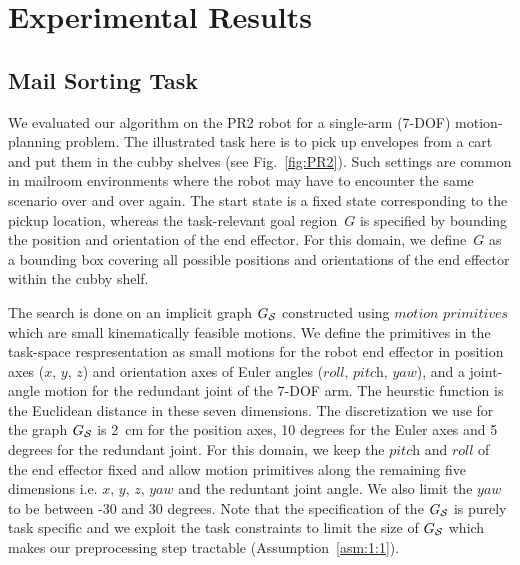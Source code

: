 \documentclass[a4paper]{report}
\begin{document}
\section{Experimental Results}
\label{sec:eval1}

\subsection{Mail Sorting Task}

We evaluated our algorithm on the PR2 robot for a single-arm (7-DOF) motion-planning problem. The illustrated task here is to pick up envelopes from a cart and put them in the cubby shelves (see Fig.~\ref{fig:PR2}). Such settings are common in mailroom environments where the robot may have to encounter the same scenario over and over again. The start state is a fixed state corresponding to the pickup location, whereas the task-relevant goal region~$G$ is specified by bounding the position and orientation of the end effector. For this domain, we define~$G$ as a bounding box covering all possible positions and orientations of the end effector within the cubby shelf.

The search is done on an implicit graph $G_\mathcal{S}$ constructed using $\textit{motion primitives}$ which are small kinematically feasible motions. We define the primitives in the task-space respresentation as small motions for the robot end effector in position axes ($\textit{x, y, z}$) and orientation axes of Euler angles ($\textit{roll, pitch, yaw}$), and a joint-angle motion for the redundant joint of the 7-DOF arm. 
The heurstic function is the Euclidean distance in these seven dimensions. The discretization we use for the graph $G_\mathcal{S}$ is 2~cm for the position axes, 10 degrees for the Euler axes and 5 degrees for the redundant joint. 
For this domain, we keep the $\textit{pitch}$ and $\textit{roll}$ of the end effector fixed and allow motion primitives along the remaining five dimensions i.e. $\textit{x, y, z, yaw}$ and the reduntant joint angle. We also limit the $\textit{yaw}$ to be between -30 and 30 degrees. Note that the specification of the $G_\mathcal{S}$ is purely task specific and we exploit the task constraints to limit the size of $G_\mathcal{S}$ which makes our preprocessing step tractable (Assumption~\ref{asm:1:1}).
\end{document}
